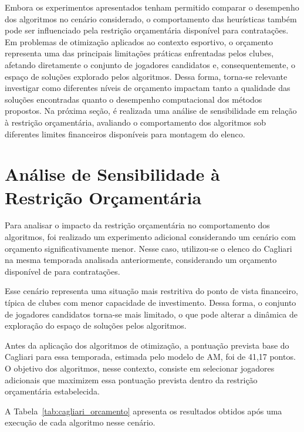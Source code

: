 Embora os experimentos apresentados tenham permitido comparar o desempenho dos 
algoritmos no cenário considerado, o comportamento das heurísticas também pode 
ser influenciado pela restrição orçamentária disponível para contratações. 
Em problemas de otimização aplicados ao contexto esportivo, o orçamento representa 
uma das principais limitações práticas enfrentadas pelos clubes, afetando 
diretamente o conjunto de jogadores candidatos e, consequentemente, o espaço de 
soluções explorado pelos algoritmos. Dessa forma, torna-se relevante investigar 
como diferentes níveis de orçamento impactam tanto a qualidade das soluções 
encontradas quanto o desempenho computacional dos métodos propostos. Na próxima 
seção, é realizada uma análise de sensibilidade em relação à restrição orçamentária, 
avaliando o comportamento dos algoritmos sob diferentes limites financeiros 
disponíveis para montagem do elenco.

\section{Análise de Sensibilidade à Restrição Orçamentária}

Para analisar o impacto da restrição orçamentária no comportamento dos algoritmos, 
foi realizado um experimento adicional considerando um cenário com orçamento 
significativamente menor. Nesse caso, utilizou-se o elenco do Cagliari na mesma 
temporada analisada anteriormente, considerando um orçamento disponível de 
 para contratações.

Esse cenário representa uma situação mais restritiva do ponto de vista financeiro, 
típica de clubes com menor capacidade de investimento. 
Dessa forma, o conjunto de jogadores candidatos torna-se mais limitado, o que pode 
alterar a dinâmica de exploração do espaço de soluções pelos algoritmos.

Antes da aplicação dos algoritmos de otimização, a pontuação prevista base do 
Cagliari para essa temporada, estimada pelo modelo de AM, foi de 41,17 pontos. 
O objetivo dos algoritmos, nesse contexto, consiste em selecionar jogadores adicionais 
que maximizem essa pontuação prevista dentro da restrição orçamentária estabelecida.

A Tabela~\ref{tab:cagliari_orcamento} apresenta os resultados obtidos após uma 
execução de cada algoritmo nesse cenário.


